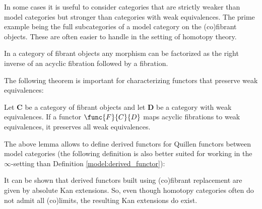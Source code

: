     In some cases it is useful to consider categories that are strictly weaker than model categories but stronger than categories with weak equivalences. The prime example being the full subcategories of a model category on the (co)fibrant objects. These are often easier to handle in the setting of homotopy theory.

    \begin{theorem}
        In a category of fibrant objects any morphism can be factorized as the right inverse of an acyclic fibration followed by a fibration.
    \end{theorem}

    The following theorem is important for characterizing functors that preserve weak equivalences:
    \begin{theorem}\label{model:ken_brown}
        Let $\mathbf{C}$ be a category of fibrant objects and let $\mathbf{D}$ be a category with weak equivalences. If a functor $\func{F}{C}{D}$ maps acyclic fibrations to weak equivalences, it preserves all weak equivalences.
    \end{theorem}

    The above lemma allows to define derived functors for Quillen functors between model categories (the following definition is also better suited for working in the $\infty$-setting than Definition \ref{model:derived_functor}):
    \begin{property}\label{model:absolute_derived_functors}
        It can be shown that derived functors built using (co)fibrant replacement are given by absolute Kan extensions. So, even though homotopy categories often do not admit all (co)limits, the resulting Kan extensions do exist.
    \end{property}

